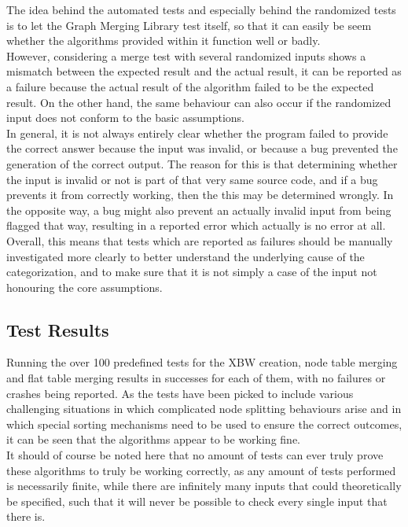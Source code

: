 \documentclass[a4paper,12pt,twoside,BCOR=10mm]{scrbook}
\begin{document}
The idea behind the automated tests and especially behind the randomized tests 
is to let the Graph Merging Library test itself,
so that it can easily be seem whether the algorithms provided within it 
function well or badly. \\
However, considering a merge test with several randomized inputs shows a mismatch 
between the expected result and the actual result, 
it can be reported as a failure because the actual result of the algorithm 
failed to be the expected result. 
On the other hand, the same behaviour can also occur if the randomized input 
does not conform to the basic assumptions. \\
In general, it is not always entirely clear whether the program failed to provide the correct answer 
because the input was invalid, or because a bug prevented the generation of the correct output. 
The reason for this is that determining whether the input is invalid or not is part of that 
very same source code, and if a bug prevents it from correctly working, then the this may be determined 
wrongly. In the opposite way, a bug might also prevent an actually invalid input from being 
flagged that way, resulting in a reported error which actually is no error at all. \\
Overall, this means that tests which are reported as failures should be manually investigated more clearly to 
better understand the underlying cause of the categorization, and to make sure that it is not simply a case 
of the input not honouring the core assumptions.

\subsection{Test Results}

Running the over 100 predefined tests for the XBW creation, node table merging 
and flat table merging results in successes for each of them, 
with no failures or crashes being reported. 
As the tests have been picked to include various challenging situations 
in which complicated node splitting behaviours arise and in which 
special sorting mechanisms need to be used to ensure the correct outcomes, 
it can be seen that the algorithms appear to be working fine. \\
It should of course be noted here that no amount of tests can ever 
truly prove these algorithms to truly be working correctly, 
as any amount of tests performed is necessarily finite, while there are 
infinitely many inputs that could theoretically be specified, 
such that it will never be possible to check every single input that there is.
\end{document}
